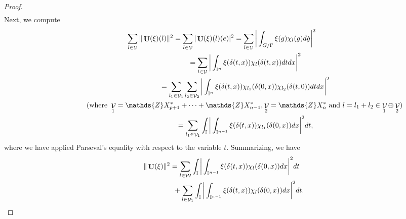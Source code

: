 \documentclass[pdftex]{sigma}
\DeclareMathOperator{\U}{\mathbf{U}}
\DeclareMathOperator{\nongen}{\mathcal{V}}
\DeclareMathOperator{\gen}{\mathcal{W}}
\def\tore{{\mathbb I}}
\begin{document}
\begin{proof}
\begin{gather*}
\end{gather*}
Next, we compute
\begin{gather*}
\sum_{l\in
  \nongen}
    \|\U(\xi)(l)\|^2  =
\sum_{l\in \nongen}
    | \U(\xi)(l)(e) |^2  = \sum_{l\in \nongen}\bigg|\int_{G/\Gamma}
    \xi(g) \chi_l(g) d\dot{g} \bigg|^2\\
\hphantom{\sum_{l\in   \nongen}     \|\U(\xi)(l)\|^2}
 = \sum_{l\in \nongen}\bigg|\int_{\tore^{n}}
    \xi(\delta(t, x)) \chi_l(\delta(t, x)
 ) dt dx \bigg|^2\\
\hphantom{\sum_{l\in   \nongen} \|\U(\xi)(l)\|^2}
 = \sum_{l_1\in \nongen_1} \sum_{l_2\in \nongen_2} \bigg|\int_{\tore^{n}}
    \xi(\delta(t, x)) \chi_{l_1}(\delta(0, x))
     \chi_{l_2}(\delta(t, 0) ) dt dx \bigg|^2\\
\hphantom{\sum_{l\in   \nongen} \|\U(\xi)(l)\|^2}
 (\text{where} \ \nongen_1 = \mathds{Z} X_{p+1}^*+\cdots+\mathds{Z}X_{n-1}^*,
     \nongen_2 =\mathds{Z}X_{n}^* \text{ and } l = l_1+l_2
      \in \nongen_1\oplus \nongen_2) \\
\hphantom{\sum_{l\in   \nongen} \|\U(\xi)(l)\|^2}
 = \sum_{l_1\in \nongen_1} \int_{\tore} \bigg|\int_{\tore^{n-1}}
    \xi(\delta(t, x))
 \chi_{l_1}(\delta(0, x))  dx \bigg|^2 dt,
\end{gather*}
where we have applied Parseval's equality with respect to the
variable $t$. Summarizing, we have
\begin{gather*}
  \|\U(\xi)\|^2    =  \sum_{l\in \gen}  \int_{\tore}
 \bigg|
 \int_{\tore^{n-1}} \xi(\delta(t, x))
  \chi_l (\delta(0, x))
 dx  \bigg|^2  dt \\
\hphantom{\|\U(\xi)\|^2    =}{}
+  \sum_{l\in \nongen_1} \int_{\tore}
\bigg|\int_{\tore^{n-1}}
    \xi(\delta(t, x))\chi_{l}(\delta(0, x))
dx \bigg|^2 dt.
\end{gather*}


\end{proof}
\end{document}
